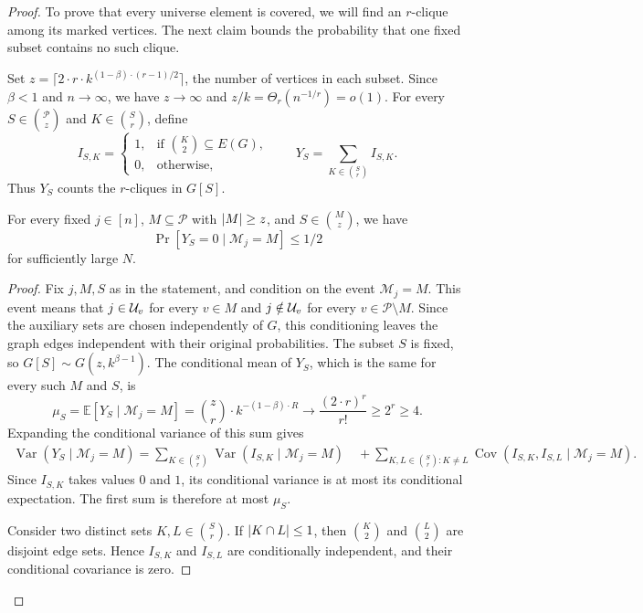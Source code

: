 \begin{proof}
    To prove that every universe element is covered, we will find an $r$-clique among its marked vertices. The next claim bounds the probability that one fixed subset contains no such clique.

    Set $z=\lceil2\cdot r\cdot k^{(1-\beta)\cdot(r-1)/2}\rceil$, the number of vertices in each subset. Since $\beta<1$ and $n\to\infty$, we have $z\to\infty$ and $z/k=\Theta_r(n^{-1/r})=o(1)$. For every $S\in\binom{\mathcal P}{z}$ and $K\in\binom{S}{r}$, define
    \[
        I_{S,K}=\begin{cases}
            1,&\text{if }\binom{K}{2}\subseteq E(G),\\
            0,&\text{otherwise},
        \end{cases}
        \qquad
        Y_S=\sum_{K\in\binom{S}{r}}I_{S,K}.
    \]
    Thus $Y_S$ counts the $r$-cliques in $G[S]$.
    \begin{claim}\label{claim:PDS-subset-clique}
        For every fixed $j\in[n]$, $M\subseteq\mathcal P$ with $\mathopen{}\left| M \right|\geq z$, and $S\in\binom{M}{z}$, we have
        \[
            \Pr[Y_S=0\mid\mathcal M_j=M]\leq1/2
        \]
        for sufficiently large $N$.
    \end{claim}
    \begin{proof}
    Fix $j,M,S$ as in the statement, and condition on the event $\mathcal M_j=M$. This event means that $j\in\mathcal{U}_v$ for every $v\in M$ and $j\notin\mathcal{U}_v$ for every $v\in\mathcal P\setminus M$. Since the auxiliary sets are chosen independently of $G$, this conditioning leaves the graph edges independent with their original probabilities. The subset $S$ is fixed, so $G[S]\sim G(z,k^{\beta-1})$. The conditional mean of $Y_S$, which is the same for every such $M$ and $S$, is
    \[
        \mu_S=\mathbb{E}[Y_S\mid\mathcal M_j=M]=\binom{z}{r} \cdot k^{-(1-\beta)\cdot R}
        \longrightarrow\frac{(2\cdot r)^r}{r!}\geq2^r\geq4.
    \]
    Expanding the conditional variance of this sum gives
    \begin{align*}
        \operatorname{Var}(Y_S\mid\mathcal M_j=M)=\sum_{K\in\binom{S}{r}}\operatorname{Var}(I_{S,K}\mid\mathcal M_j=M)\quad+\sum_{K,L\in\binom{S}{r}\colon K\neq L}
        \operatorname{Cov}(I_{S,K},I_{S,L}\mid\mathcal M_j=M).
    \end{align*}
    Since $I_{S,K}$ takes values $0$ and $1$, its conditional variance is at most its conditional expectation. The first sum is therefore at most $\mu_S$.

    Consider two distinct sets $K,L\in\binom{S}{r}$. If $\mathopen{}\left| K\cap L \right|\leq1$, then $\binom{K}{2}$ and $\binom{L}{2}$ are disjoint edge sets. Hence $I_{S,K}$ and $I_{S,L}$ are conditionally independent, and their conditional covariance is zero.


\end{proof}
\end{proof}
